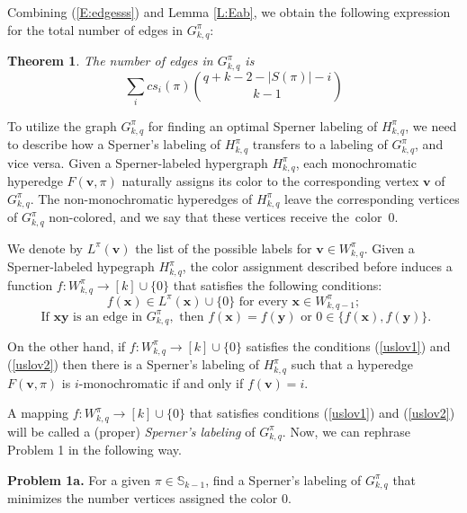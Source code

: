 \documentclass{birkjour}
\newtheorem{thm}{Theorem}[section]
\theoremstyle{definition}
\theoremstyle{remark}
\numberwithin{equation}{section}
\begin{document}
\noindent Combining (\ref{E:edgesss}) and Lemma \ref{L:Eab}, we
obtain the following expression for the total number of edges in
$G_{k,q}^\pi$:
\begin{thm}
The number of edges in $G_{k,q}^\pi$ is
$$\sum_{i} cs_i(\pi){q+k-2-|S(\pi)|-i\choose k-1}$$
\end{thm}



To utilize the graph $G_{k,q}^\pi$  for finding an optimal Sperner
labeling of $H_{k,q}^\pi$, we need to describe how a Sperner's
labeling of $H_{k,q}^\pi$ transfers to a labeling of
$G_{k,q}^\pi$, and vice versa. Given a Sperner-labeled hypergraph
 $H^\pi_{k,q}$, each monochromatic hyperedge $F(\mathbf{v},\pi)$
  naturally assigns its color
  to the corresponding vertex $\mathbf{v}$ of $G_{k,q}^\pi$.
 The non-monochromatic hyperedges of
 $H^\pi_{k,q}$ leave the corresponding vertices of $G_{k,q}^\pi$
 non-colored, and we say that these vertices receive \mbox{the color $0$.}

We denote by $L^\pi(\mathbf{v})$ the list of the possible labels
for $\mathbf{v}\in W_{k,q}^\pi$. Given a Sperner-labeled hypegraph
$H_{k,q}^\pi$, the color assignment described before induces a
function $f:W_{k,q}^\pi\to[k]\cup\{0\}$ that satisfies the following
conditions:
\begin{equation}\label{uslov1}
    f(\mathbf{x})\in L^\pi(\mathbf{x})\cup\{0\}
     \text{\ for every\ } \mathbf{x}\in W^\pi_{k,q-1};
\end{equation}
\begin{equation}\label{uslov2}
    \text{\ If\ } \mathbf{xy} \text{\ is an edge in\ } G^\pi_{k,q},
    \text{\ then\ } f(\mathbf{x})=f(\mathbf{y}) \text{\ or\ }
    0\in \{f(\mathbf{x}),f(\mathbf{y})\}.
\end{equation}

On the other hand, if $f:W_{k,q}^\pi\to[k]\cup\{0\}$ satisfies
the conditions (\ref{uslov1}) and (\ref{uslov2})
then there is a Sperner's labeling of $H_{k,q}^\pi$ such that
a hyperedge $F(\mathbf{v},\pi)$  is $i$-monochromatic
if and only if $f(\mathbf{v})=i$.

A mapping $f:W_{k,q}^\pi\to[k]\cup\{0\}$ that satisfies conditions
(\ref{uslov1}) and (\ref{uslov2}) will be called a (proper)
\emph{Sperner's labeling} of $G_{k,q}^\pi$. Now, we can rephrase
Problem 1 in the following way.\vspace{.2cm}

\textbf{Problem 1a.} For a given $\pi\in\mathbb S_{k-1}$,
find a Sperner's labeling of $G_{k,q}^\pi$ that minimizes
the number vertices assigned the color $0$.\\
\end{document}

